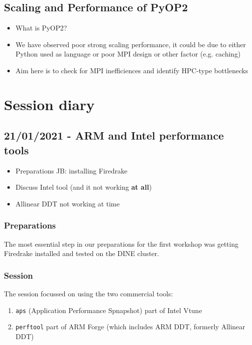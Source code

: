 \documentclass[a4paper,11pt]{article}
\newenvironment{jacknotes}{\color{red}\renewcommand{\labelitemi}{$\star$}\begin{itemize}}{\end{itemize}}
\newenvironment{connornotes}{\color{red}\renewcommand{\labelitemi}{$\star$}\begin{itemize}}{\end{itemize}}
\begin{document}
\subsection{Scaling and Performance of PyOP2}

\begin{connornotes}
    \item What is PyOP2?
    \item We have observed poor strong scaling performance, it could be due to either Python used as language or poor MPI design or other factor (e.g. caching)
    \item Aim here is to check for MPI inefficiences and identify HPC-type bottlenecks
\end{connornotes}


\clearpage
\section{Session diary}
\label{sec:diary}
\subsection*{21/01/2021 - ARM and Intel performance tools}
\label{ssec:arm_intel}
\begin{jacknotes}
	\item Preparations JB: installing Firedrake
	\item Discuss Intel tool (and it not working \textbf{at all})
	\item Allinear DDT not working at time
\end{jacknotes}
\subsubsection*{Preparations}
The most essential step in our preparations for the first workshop was getting Firedrake installed and tested on the DINE cluster.

\subsubsection*{Session}
The session focussed on using the two commercial tools:
\begin{enumerate}
	\item \verb`aps` (Application Performance Spnapshot) part of Intel Vtune
	\item \verb`perftool` part of ARM Forge (which includes ARM DDT, formerly Allinear DDT)
\end{enumerate}
\end{document}
